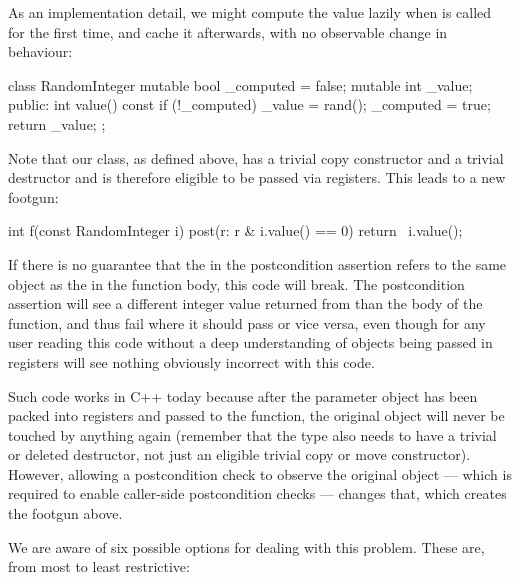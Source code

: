 As an implementation detail, we might compute the value lazily when  is called for the first time, and cache it afterwards, with no observable change in behaviour:
 \begin{codeblock}
class RandomInteger {
  mutable bool _computed = false;
  mutable int  _value;
public:
  int value() const {
    if (!_computed) {
      _value = rand();
      _computed = true;
    }
    return _value;
  }
};
 \end{codeblock}
Note that our  class, as defined above, has a trivial copy constructor and a trivial destructor and is therefore eligible to be passed via registers. This leads to a new footgun: 
 \begin{codeblock}
int f(const RandomInteger i)
post(r: r & i.value() == 0) {
  return ~i.value();
}
 \end{codeblock}
If there is no guarantee that the  in the postcondition assertion refers to the same object as the  in the function body, this code will break. The postcondition assertion will see a different integer value returned from  than the body of the function, and thus fail where it should pass or vice versa, even though for any user reading this code without a deep understanding of objects being passed in registers will see nothing obviously incorrect with this code.

Such code works in C++ today because after the parameter object has been packed into registers and passed to the function,  the original object will never be touched by anything again (remember that the type also needs to have a trivial or deleted destructor, not just an eligible trivial copy or move constructor). However, allowing a postcondition check to observe the original object --- which is required to enable caller-side postcondition checks --- changes that, which creates the footgun above.

We are aware of six possible options for dealing with this problem. These are, from most to least
restrictive:

